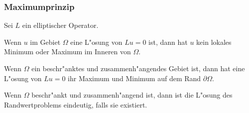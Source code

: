 \begin{frame}
\frametitle{Maximumprinzip}

Sei $L$ ein elliptischer Operator.

\begin{theorem}
Wenn $u$ im Gebiet $\Omega$ eine L"osung von $Lu=0$ ist, dann hat
$u$ kein lokales Minimum oder Maximum im Inneren von $\Omega$.
\end{theorem}

\pause

\begin{theorem}
Wenn $\Omega$ ein beschr"anktes und zusammenh"angendes Gebiet ist,
dann hat eine L"osung von $Lu=0$ ihr Maximum und Minimum auf
dem Rand $\partial \Omega$.
\end{theorem}

\pause

\begin{theorem}
Wenn $\Omega$ beschr"ankt und zusammenh"angend ist, dann ist die
L"osung des Randwertproblems eindeutig, falls sie existiert.
\end{theorem}

\end{frame}

